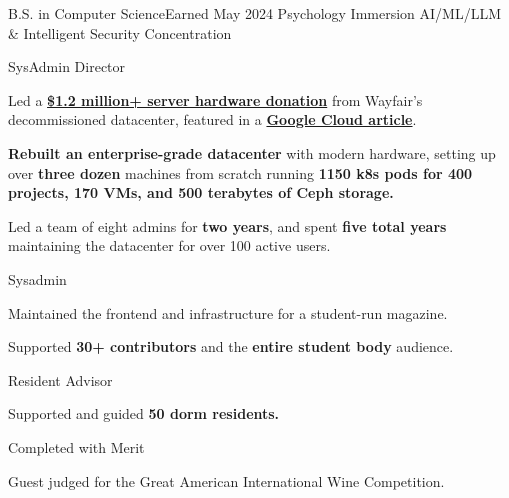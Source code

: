 \vspace{1.5pt} %

{B.S. in Computer Science}{Earned May 2024}
{Psychology Immersion}
{AI/ML/LLM \& Intelligent Security Concentration}

\cvtag{\LaTeX}

\smallskip


{
	{SysAdmin Director}    \hfill{}\newline
}
{
	\item{Led a \href{https://www.rit.edu/news/wayfair-gifts-850000-servers-rits-computer-science-house}{\textbf{\$1.2 million+ server hardware donation}} from Wayfair's decommissioned datacenter,} featured in a \href{https://cloud.google.com/blog/transform/wayfair-server-donation-mass-open-cloud-rit-student-innovation-johonnot}{\textbf{Google Cloud article}}.
	\item{\textbf{Rebuilt an enterprise-grade datacenter} with modern hardware, setting up over \textbf{three dozen} machines from scratch running \textbf{1150 k8s pods for 400 projects, 170 VMs, and 500 terabytes of Ceph storage.}}
	\item{Led a team of eight admins for \textbf{two years}, and spent \textbf{five total years} maintaining the datacenter for over 100 active users.}
}

{
	{Sysadmin} \hfill{}\newline
}
{
	\item{Maintained the frontend and infrastructure for a student-run magazine.}
	\item{Supported \textbf{30+ contributors} and the \textbf{entire student body} audience.}
}

{
	{Resident Advisor} \hfill{}\newline
}
{
	\item{Supported and guided \textbf{50 dorm residents.}}
}

{Completed with Merit \hfill{}\newline}
{
	\item{Guest judged for the Great American International Wine Competition.}
}

